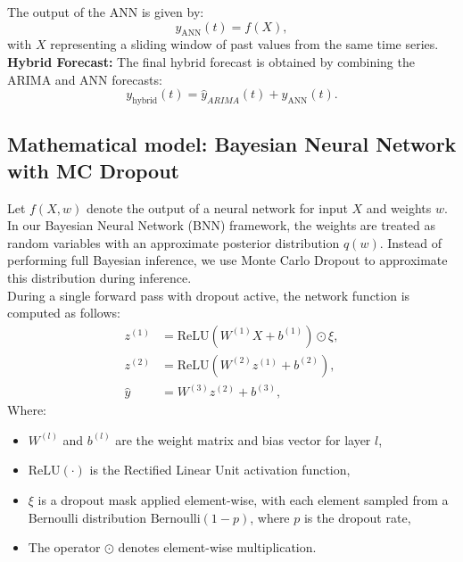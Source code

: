 The output of the ANN is given by:
\begin{equation}
    y_{\text{ANN}}(t) = f(X),
    \label{eq:ann_output}
\end{equation}
with \(X\) representing a sliding window of past values from the same time series.\\

\noindent \textbf{Hybrid Forecast:}  
The final hybrid forecast is obtained by combining the ARIMA and ANN forecasts:
\begin{equation}
    y_{\text{hybrid}}(t) = \hat{y}_{ARIMA}(t) + y_{\text{ANN}}(t).
    \label{eq:hybrid_forecast2}
\end{equation}

\subsection{Mathematical model: Bayesian Neural Network with MC Dropout}
\label{math:BNN}

Let \( f(X, w) \) denote the output of a neural network for input \( X \) and weights \( w \). In our Bayesian Neural Network (BNN) framework, the weights are treated as random variables with an approximate posterior distribution \( q(w) \). Instead of performing full Bayesian inference, we use Monte Carlo Dropout to approximate this distribution during inference.\\

\noindent During a single forward pass with dropout active, the network function is computed as follows:
\begin{align}
    z^{(1)} &= \text{ReLU}(W^{(1)} X + b^{(1)}) \odot \xi, \label{eq:dropout_layer1}\\[1mm]
    z^{(2)} &= \text{ReLU}(W^{(2)} z^{(1)} + b^{(2)}), \label{eq:dropout_layer2}\\[1mm]
    \hat{y} &= W^{(3)} z^{(2)} + b^{(3)}, \label{eq:network_output}
\end{align}
Where:
\begin{itemize}
    \item \(W^{(l)}\) and \(b^{(l)}\) are the weight matrix and bias vector for layer \(l\),
    \item \(\text{ReLU}(\cdot)\) is the Rectified Linear Unit activation function,
    \item \(\xi\) is a dropout mask applied element-wise, with each element sampled from a Bernoulli distribution \(\text{Bernoulli}(1-p)\), where \(p\) is the dropout rate,
    \item The operator \(\odot\) denotes element-wise multiplication.
\end{itemize}

